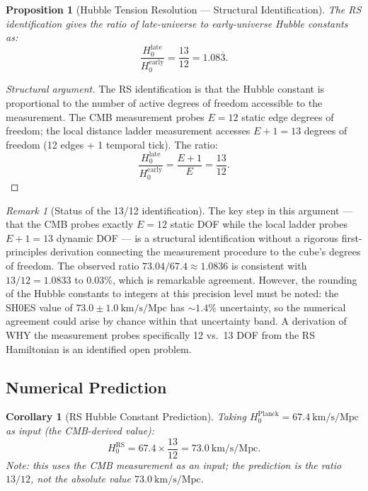 \documentclass[12pt,a4paper]{article}
\newtheorem{corollary}[theorem]{Corollary}
\newtheorem{proposition}[theorem]{Proposition}
\theoremstyle{definition}
\theoremstyle{remark}
\newtheorem{remark}[theorem]{Remark}
\begin{document}
\begin{proposition}[Hubble Tension Resolution --- Structural Identification]
\label{thm:hubble}
The RS identification gives the ratio of late-universe to early-universe
Hubble constants as:
\begin{equation}
  \boxed{\frac{H_0^{\mathrm{late}}}{H_0^{\mathrm{early}}}
  = \frac{13}{12} = 1.08\overline{3}.}
  \label{eq:ratio}
\end{equation}
\end{proposition}

\begin{proof}[Structural argument]
The RS identification is that the Hubble constant is proportional to
the number of active degrees of freedom accessible to the measurement.
The CMB measurement probes $E = 12$ static edge degrees of freedom;
the local distance ladder measurement accesses $E + 1 = 13$ degrees
of freedom (12 edges + 1 temporal tick).  The ratio:
\begin{equation}
  \frac{H_0^{\mathrm{late}}}{H_0^{\mathrm{early}}}
  = \frac{E + 1}{E} = \frac{13}{12}.
\end{equation}
\end{proof}

\begin{remark}[Status of the 13/12 identification]
\label{rem:hubble-status}
The key step in this argument --- that the CMB probes exactly $E = 12$
static DOF while the local ladder probes $E + 1 = 13$ dynamic DOF ---
is a structural identification without a rigorous first-principles
derivation connecting the measurement procedure to the cube's degrees
of freedom.  The observed ratio $73.04/67.4 \approx 1.0836$ is
consistent with $13/12 = 1.0833$ to $0.03\%$, which is remarkable
agreement.  However, the rounding of the Hubble constants to integers
at this precision level must be noted: the SH0ES value of
$73.0 \pm 1.0~\mathrm{km/s/Mpc}$ has $\sim 1.4\%$ uncertainty, so
the numerical agreement could arise by chance within that uncertainty
band.  A derivation of WHY the measurement probes specifically 12 vs.\
13 DOF from the RS Hamiltonian is an identified open problem.
\end{remark}

\subsection{Numerical Prediction}

\begin{corollary}[RS Hubble Constant Prediction]
\label{cor:h0}
Taking $H_0^{\mathrm{Planck}} = 67.4~\mathrm{km/s/Mpc}$
as input (the CMB-derived value):
\begin{equation}
  H_0^{\mathrm{RS}} = 67.4 \times \frac{13}{12}
  = 73.0~\mathrm{km/s/Mpc}.
\end{equation}
Note: this uses the CMB measurement as an input; the prediction is
the ratio $13/12$, not the absolute value $73.0~\mathrm{km/s/Mpc}$.
\end{corollary}
\end{document}
